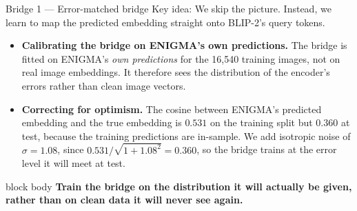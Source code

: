 \documentclass[aspectratio=169,10pt]{beamer}
\newcommand{\takeaway}[1]{%
  \vspace{0.3em}\begin{beamercolorbox}[rounded=true,sep=0.55em]{block body}
  \textbf{#1}
  \end{beamercolorbox}}
\begin{document}
\begin{frame}{Bridge 1 --- Error-matched bridge}
  \small
  Key idea: We skip the picture. Instead, we learn to map the predicted embedding straight onto BLIP-2's query tokens.

  \vspace{0.55em}
  \centering

  \vspace{0.55em}
  \begin{itemize}
    \item \textbf{Calibrating the bridge on ENIGMA's own predictions.} The bridge is fitted on ENIGMA's \emph{own
          predictions} for the 16{,}540 training images, not on real image embeddings. It therefore
          sees the distribution of the encoder's errors rather than clean image vectors.
    \item \textbf{Correcting for optimism.} The cosine between ENIGMA's predicted embedding and the true embedding is $0.531$ on
          the training split but $0.360$ at test, because the training predictions are in-sample.
          We add isotropic noise of $\sigma=1.08$, since
          $0.531/\sqrt{1+1.08^{2}}=0.360$, so the bridge trains at the error level it will meet at test.
  \end{itemize}

  \takeaway{Train the bridge on the distribution it will actually be given, rather than on
  clean data it will never see again.}
\end{frame}
\end{document}
